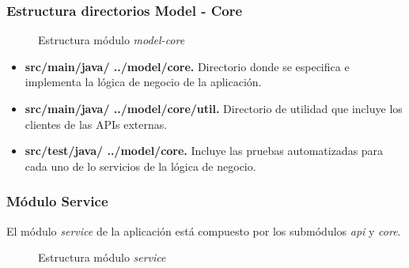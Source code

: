 \subsubsection*{Estructura directorios Model - Core}
\begin{figure}[H]
\centering
{}
\caption{Estructura módulo \textit{model-core}}
\end{figure}

\begin{itemize}
	\item \textbf{src/main/java/ ../model/core. } Directorio donde se especifica e implementa la lógica de negocio de la aplicación.
	\item \textbf{src/main/java/ ../model/core/util. } Directorio de utilidad que incluye los clientes de las APIs externas.
	\item \textbf{src/test/java/ ../model/core. } Incluye las pruebas automatizadas para cada uno de lo servicios de la lógica de negocio.
\end{itemize}


\subsubsection*{Módulo Service}
El módulo \textit{service} de la aplicación está compuesto por los submódulos \textit{api} y \textit{core}.

\begin{figure}[H]
\centering
{}
\caption{Estructura módulo \textit{service}}
\end{figure}


